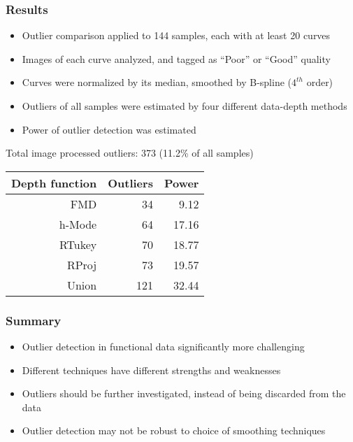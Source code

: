 \documentclass[10pt,dvipsnames,table]{beamer}
\begin{document}
\begin{frame}
\frametitle{Results}
\begin{itemize}
\item Outlier comparison applied to 144 samples, each with at least 20 curves
\item Images of each curve analyzed, and tagged as ``Poor'' or ``Good'' quality
\item Curves were normalized by its median, smoothed by B-spline ($4^{th}$ order)
\item Outliers of all samples were estimated by four different data-depth methods
\item Power of outlier detection was estimated
\end{itemize}
\pause
Total image processed outliers: 373 (11.2\% of all samples) \\
\begin{table}[ht]
\centering
\begin{tabular}{rrr}
  \hline
  \hline
  Depth function & Outliers & Power \\ 
  \hline
  FMD & 34 & 9.12 \\ 
  h-Mode & 64 & 17.16 \\ 
  RTukey & 70 & 18.77 \\ 
  RProj & 73 & 19.57 \\ 
  Union & 121 & 32.44 \\ 
  \hline
  \hline
\end{tabular}
\end{table}
\end{frame}

\begin{frame}
\frametitle{Summary}
\begin{itemize}
\item Outlier detection in functional data significantly more challenging
\item Different techniques have different strengths and weaknesses
\item Outliers should be further investigated, instead of being discarded from the data
\item Outlier detection may not be robust to choice of smoothing techniques
\end{itemize}

\end{frame}
\end{document}
